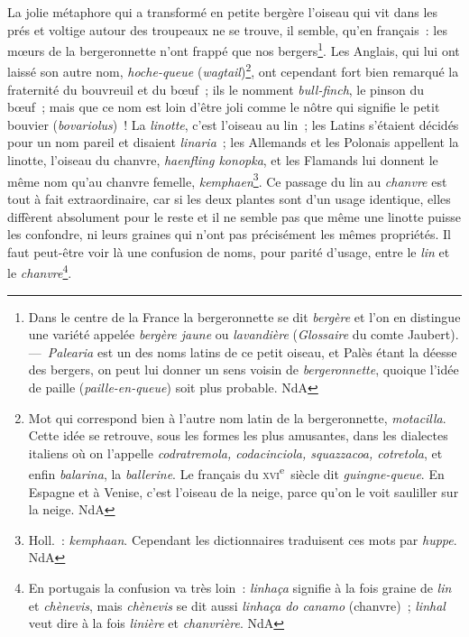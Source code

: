 \documentclass[french,twoside]{book} %
\begin{document}
La jolie métaphore qui a transformé en petite bergère l’oiseau qui vit dans les prés et voltige autour des troupeaux ne se trouve, il semble, qu’en français : les mœurs de la bergeronnette n’ont frappé que nos bergers\footnote{ Dans le centre de la France la bergeronnette se dit {\itshape bergère} et l’on en distingue une variété appelée {\itshape bergère jaune} ou {\itshape lavandière} ({\itshape Glossaire} du comte Jaubert). — {\itshape Palearia} est un des noms latins de ce petit oiseau, et Palès étant la déesse des bergers, on peut lui donner un sens voisin de {\itshape bergeronnette}, quoique l’idée de paille ({\itshape paille-en-queue}) soit plus probable. NdA}. Les Anglais, qui lui ont laissé son autre nom, {\itshape hoche-queue} ({\itshape wagtail})\footnote{ Mot qui correspond bien à l’autre nom latin de la bergeronnette, {\itshape motacilla}. Cette idée se retrouve, sous les formes les plus amusantes, dans les dialectes italiens où on l’appelle {\itshape codratremola, codacinciola, squazzacoa, cotretola}, et enfin {\itshape balarina}, la {\itshape ballerine}. Le français du \textsc{xvi}\textsuperscript{e} siècle dit {\itshape guingne-queue}. En Espagne et à Venise, c’est l’oiseau de la neige, parce qu’on le voit sauliller sur la neige. NdA}, ont cependant fort bien remarqué la fraternité du bouvreuil et du bœuf ; ils le nomment {\itshape bull-finch}, le pinson du bœuf ; mais que ce nom est loin d’être joli comme le nôtre qui signifie le petit bouvier ({\itshape bovariolus}) ! La {\itshape linotte}, c’est l’oiseau au lin ; les Latins s’étaient décidés pour un nom pareil et disaient {\itshape linaria} ; les Allemands et les Polonais appellent la linotte, l’oiseau du chanvre, {\itshape haenfling konopka}, et les Flamands lui donnent le même nom qu’au chanvre femelle, {\itshape kemphaen}\footnote{ Holl. : {\itshape kemphaan}. Cependant les dictionnaires traduisent ces mots par {\itshape huppe}. NdA}. Ce passage du lin au {\itshape chanvre} est tout à fait extraordinaire, car si les deux plantes sont d’un usage identique, elles diffèrent absolument pour le reste et il ne semble pas que même une linotte puisse les confondre, ni leurs graines qui n’ont pas précisément les mêmes propriétés. Il faut peut-être voir là une confusion de noms, pour parité d’usage, entre le {\itshape lin} et le {\itshape chanvre}\footnote{ En portugais la confusion va très loin : {\itshape linhaça} signifie à la fois graine de {\itshape lin} et {\itshape chènevis}, mais {\itshape chènevis} se dit aussi {\itshape linhaça do canamo} (chanvre) ; {\itshape linhal} veut dire à la fois {\itshape linière} et {\itshape chanvrière}. NdA}.\par
\end{document}
